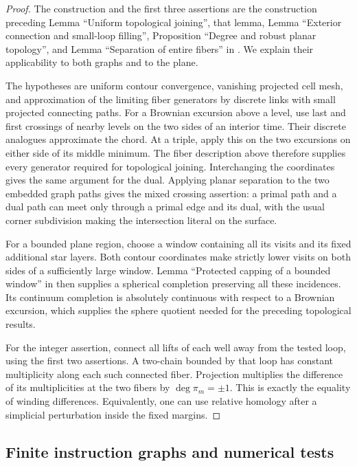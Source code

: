\begin{proof}
The construction and the first three assertions are the construction
preceding Lemma ``Uniform topological joining'', that lemma,
Lemma ``Exterior connection and small-loop filling'', Proposition
``Degree and robust planar topology'', and Lemma ``Separation of
entire fibers'' in \cite{MetricMaps}.
We explain their applicability to both graphs and to the plane.

The hypotheses are uniform contour convergence, vanishing projected
cell mesh, and approximation of the limiting fiber generators by
discrete links with small projected connecting paths.  For a Brownian
excursion above a level, use last and first crossings of nearby levels
on the two sides of an interior time.  Their discrete analogues
approximate the chord.  At a triple, apply this on the two excursions
on either side of its middle minimum.  The fiber description above
therefore supplies every generator required for topological joining.
Interchanging the coordinates gives the same argument for the dual.
Applying planar separation to the two embedded graph paths gives the
mixed crossing assertion: a primal path and a dual path can meet only
through a primal edge and its dual, with the usual corner subdivision
making the intersection literal on the surface.

For a bounded plane region, choose a window containing all its visits
and its fixed additional star layers.  Both contour coordinates make
strictly lower visits on both sides of a sufficiently large window.
Lemma ``Protected capping of a bounded window'' in
\cite{MetricMaps} then supplies a spherical completion preserving
all these incidences.  Its continuum completion is absolutely
continuous with respect to a Brownian excursion, which supplies the
sphere quotient needed for the preceding topological results.

For the integer assertion, connect all lifts of each well away from
the tested loop, using the first two assertions.  A two-chain bounded
by that loop has constant multiplicity along each such connected
fiber.  Projection multiplies the difference of its multiplicities
at the two fibers by $\deg\pi_m=\pm1$.  This is exactly the equality
of winding differences.  Equivalently, one can use relative homology
after a simplicial perturbation inside the fixed margins.
\end{proof}

\subsection{Finite instruction graphs and numerical tests}


